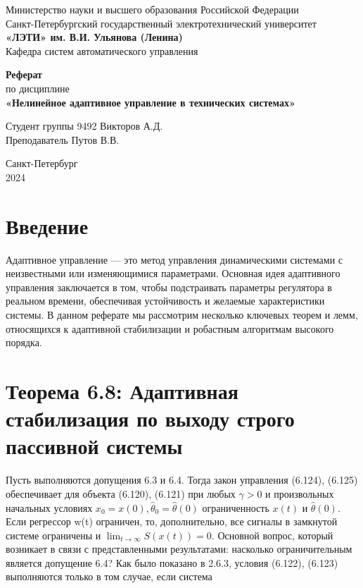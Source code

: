 \documentclass[a4paper,14pt]{extarticle} %
\begin{document}
\begin{titlepage}
    \begin{center}
        \large
        Министерство науки и высшего образования Российской Федерации \\
        Санкт-Петербургский государственный электротехнический университет \\
        \textbf{«ЛЭТИ» им. В.И. Ульянова (Ленина)} \\
        Кафедра систем автоматического управления

        \vfill

        \textbf{Реферат} \\
        по дисциплине \\
        \textbf{«Нелинейное адаптивное управление в технических системах»}

        \vfill

        Студент группы 9492 \hfill Викторов А.Д. \\
        Преподаватель \hfill Путов В.В.

        \vfill
        Санкт-Петербург \\
        2024
    \end{center}
\end{titlepage}

\setcounter{page}{2}
\tableofcontents

\newpage
\section{Введение}
Адаптивное управление — это метод управления динамическими системами с неизвестными или изменяющимися параметрами. Основная идея адаптивного управления заключается в том, чтобы подстраивать параметры регулятора в реальном времени, обеспечивая устойчивость и желаемые характеристики системы. В данном реферате мы рассмотрим несколько ключевых теорем и лемм, относящихся к адаптивной стабилизации и робастным алгоритмам высокого порядка.

\newpage
\section{Теорема 6.8: Адаптивная стабилизация по выходу строго пассивной системы}
Пусть выполняются допущения 6.3 и 6.4. Тогда закон управления (6.124), (6.125) обеспечивает для объекта (6.120), (6.121) при любых \(\gamma > 0\) и произвольных начальных условиях 
\(
x_0 = x(0), \hat{\theta}_0 = \hat{\theta}(0)
\) 
ограниченность \(x(t)\) и \(\hat{\theta}(0)\). Если регрессор w(t) ограничен, то, дополнительно, все сигналы в замкнутой системе ограничены и $\lim_{t\to\infty} S(x(t)) = 0.$
Основной вопрос, который возникает в связи с представленными результатами: насколько ограничительным является допущение 6.4? Как было показано в 2.6.3, условия (6.122), (6.123) выполняются только в том случае, если система
\end{document}
